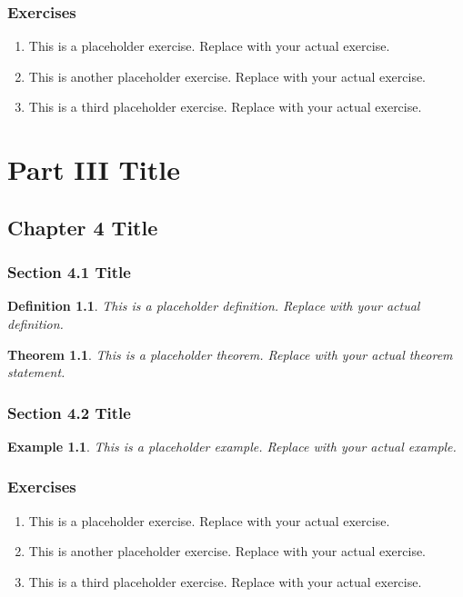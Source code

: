\documentclass[11pt]{book}
\newtheorem{definition}{Definition}[chapter]
\newtheorem{theorem}{Theorem}[chapter]
\newtheorem{example}{Example}[chapter]
\begin{document}
\section{Exercises}
\begin{enumerate}
\item This is a placeholder exercise. Replace with your actual exercise.
\item This is another placeholder exercise. Replace with your actual exercise.
\item This is a third placeholder exercise. Replace with your actual exercise.
\end{enumerate}

\part{Part III Title}

\chapter{Chapter 4 Title}
\section{Section 4.1 Title}
\begin{definition}
This is a placeholder definition. Replace with your actual definition.
\end{definition}

\begin{theorem}
This is a placeholder theorem. Replace with your actual theorem statement.
\end{theorem}

\section{Section 4.2 Title}
\begin{example}
This is a placeholder example. Replace with your actual example.
\end{example}

\section{Exercises}
\begin{enumerate}
\item This is a placeholder exercise. Replace with your actual exercise.
\item This is another placeholder exercise. Replace with your actual exercise.
\item This is a third placeholder exercise. Replace with your actual exercise.
\end{enumerate}
\end{document}
